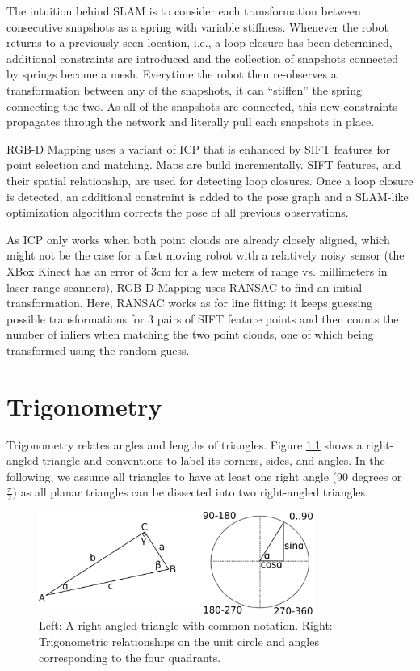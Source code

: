 \documentclass[paper=6.14in:9.21in,pagesize=pdftex,11pt,twoside,openright]{scrbook}
\begin{document}
The intuition behind SLAM is to consider each transformation between consecutive snapshots as a spring with variable stiffness. Whenever the robot returns to a previously seen location, i.e., a loop-closure has been determined, additional constraints are introduced and the collection of snapshots connected by springs become a mesh. Everytime the robot then re-observes a transformation between any of the snapshots, it can ``stiffen'' the spring connecting the two. As all of the snapshots are connected, this new constraints propagates through the network and literally pull each snapshots in place.

RGB-D Mapping uses a variant of ICP that is enhanced by SIFT features for point selection and matching. Maps are build incrementally. SIFT features, and their spatial relationship, are used for detecting loop closures. Once a loop closure is detected, an additional constraint is added to the pose graph and a SLAM-like optimization algorithm corrects the pose of all previous observations.

As ICP only works when both point clouds are already closely aligned, which might not be the case for a fast moving robot with a relatively noisy sensor (the XBox Kinect has an error of 3cm for a few meters of range vs. millimeters in laser range scanners), RGB-D Mapping uses RANSAC to find an initial transformation. Here, RANSAC works as for line fitting: it keeps guessing possible transformations for 3 pairs of SIFT feature points and then counts the number of inliers when matching the two point clouds, one of which being transformed using the random guess.



\appendix
\chapter{Trigonometry}
Trigonometry relates angles and lengths of triangles. Figure \ref{fig:triangle} shows a right-angled triangle and conventions to label its corners, sides, and angles. In the following, we assume all triangles to have at least one right angle (90 degrees or $\frac{\pi}{2})$ as all planar triangles can be dissected into two right-angled triangles. 

\begin{figure}[!htb]
\centering
\includegraphics[width=0.8\textwidth]{figs/triangle}
\caption{Left: A right-angled triangle with common notation. Right: Trigonometric relationships on the unit circle and angles corresponding to the four quadrants. \label{fig:triangle}}
\end{figure}
\end{document}
